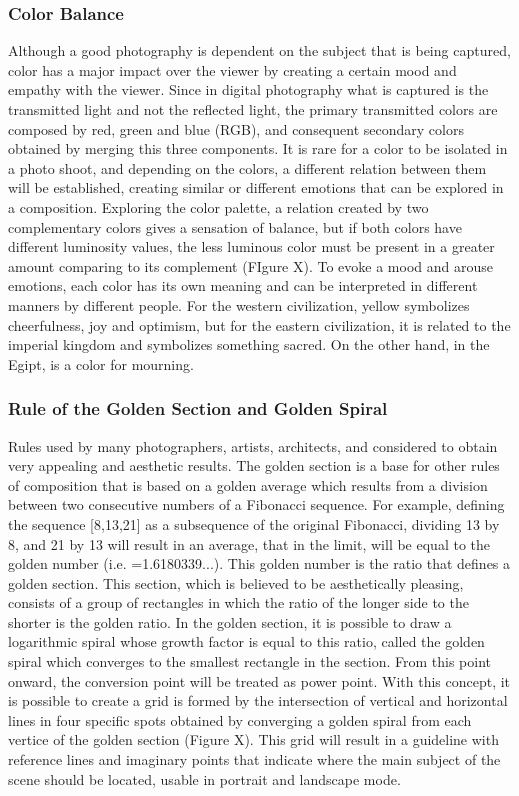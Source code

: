 \subsubsection{Color Balance}
\label{subsub:color_balance}
Although a good photography is dependent on the subject that is being captured, color has a major impact over the viewer by creating a certain mood and empathy with the viewer. Since in digital photography what is captured is the transmitted light and not the reflected light, the primary transmitted colors are composed by red, green and blue (RGB), and consequent secondary colors obtained by merging this three components. It is rare for a color to be isolated in a photo shoot, and depending on the colors, a different relation between them will be established, creating similar or different emotions that can be explored in a composition.
Exploring the color palette, a relation created by two complementary colors gives a sensation of balance, but if both colors have different luminosity values, the less luminous color must be present in a greater amount comparing to its complement (FIgure X).
To evoke a mood and arouse emotions, each color has its own meaning and can be interpreted in different manners by different people. For the western civilization, yellow symbolizes cheerfulness, joy and optimism, but for the eastern civilization, it is related to the imperial kingdom and symbolizes something sacred. On the other hand, in the Egipt, is a color for mourning.

\subsubsection{Rule of the Golden Section and Golden Spiral}
\label{subsub:golden_section}

Rules used by many photographers, artists, architects, and considered to obtain very appealing and aesthetic results. The golden section is a base for other rules of composition that is based on a golden average which results from a division between two consecutive numbers of a Fibonacci sequence. For example, defining the sequence [8,13,21] as a subsequence of the original Fibonacci, dividing 13 by 8, and 21 by 13 will result in an average, that in the limit, will be equal to the golden number (i.e. =1.6180339...). This golden number is the ratio that defines a golden section. This section, which is believed to be aesthetically pleasing, consists of a group of rectangles in which the ratio of the longer side to the shorter is the golden ratio. In the golden section, it is possible to draw a logarithmic spiral whose growth factor is equal to this ratio, called the golden spiral which converges to the smallest rectangle in the section. From this point onward, the conversion point will be treated as power point. 
With this concept, it is possible to create a grid is formed by the intersection of vertical and horizontal lines in four specific spots obtained by converging a golden spiral from each vertice of the golden section (Figure X). This grid will result in a guideline with reference lines and imaginary points that indicate where the main subject of the scene should be located, usable in portrait and landscape mode.

